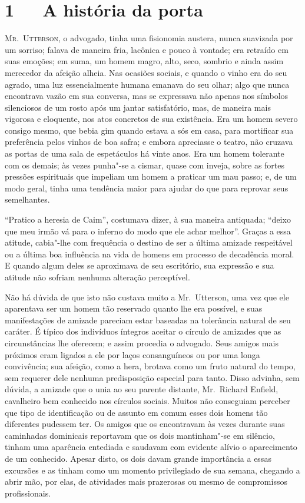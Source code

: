 \chapter[1\ \ \ A história da porta]{1\ \ \ A história da porta}

\textsc{Mr.~Utterson,} o advogado, tinha uma fisionomia austera, nunca suavizada
por um sorriso; falava de maneira fria, lacônica e pouco à vontade; era
retraído em suas emoções; em suma, um homem magro, alto, seco, sombrio
e ainda assim merecedor da afeição alheia.  Nas ocasiões sociais, e
quando o vinho era do seu agrado, uma luz essencialmente humana emanava
do seu olhar; algo que nunca encontrava vazão em sua conversa, mas se
expressava não apenas nos símbolos silenciosos de um rosto após um
jantar satisfatório, mas, de maneira mais vigorosa e eloquente, nos
atos concretos de sua existência.  Era um homem severo consigo mesmo,
que bebia gim quando estava a sós em casa, para mortificar sua
preferência pelos vinhos de boa safra; e embora apreciasse o teatro,
não cruzava as portas de uma sala de espetáculos há vinte anos.  Era um
homem tolerante com os demais; às vezes punha"-se a cismar, quase com
inveja, sobre as fortes pressões espirituais que impeliam um homem a
praticar um mau passo; e, de um modo geral, tinha uma tendência maior
para ajudar do que para reprovar seus semelhantes.

“Pratico a heresia de Caim”, costumava dizer, à sua maneira antiquada;
“deixo que meu irmão vá para o inferno do modo que ele achar melhor”. 
Graças a essa atitude, cabia"-lhe com frequência o destino de ser a
última amizade respeitável ou a última boa influência na vida de homens
em processo de decadência moral.  E quando algum deles se aproximava de
seu escritório, sua expressão e sua atitude não sofriam nenhuma
alteração perceptível.

Não há dúvida de que isto não custava muito a Mr.~Utterson, uma vez que
ele aparentava ser um homem tão reservado quanto lhe era possível, e
suas manifestações de amizade pareciam estar baseadas na tolerância
natural de seu caráter.  É típico dos indivíduos íntegros aceitar o
círculo de amizades que as circunstâncias lhe oferecem; e assim
procedia o advogado.  Seus amigos mais próximos eram ligados a ele por
laços consanguíneos ou por uma longa convivência; sua afeição, como a
hera, brotava como um fruto natural do tempo, sem requerer dele nenhuma
predisposição especial para tanto.  Disso advinha, sem dúvida, a
amizade que o unia ao seu parente distante, Mr.~Richard Enfield,
cavalheiro bem conhecido nos círculos sociais.  Muitos não conseguiam
perceber que tipo de identificação ou de assunto em comum esses dois
homens tão diferentes pudessem ter.  Os amigos que os encontravam às
vezes durante suas caminhadas dominicais reportavam que os dois
mantinham"-se em silêncio, tinham uma aparência entediada e saudavam com
evidente alívio o aparecimento de um conhecido.  Apesar disto, os dois
davam grande importância a essas excursões e as tinham como um momento
privilegiado de sua semana, chegando a abrir mão, por elas, de
atividades mais prazerosas ou mesmo de compromissos profissionais.

